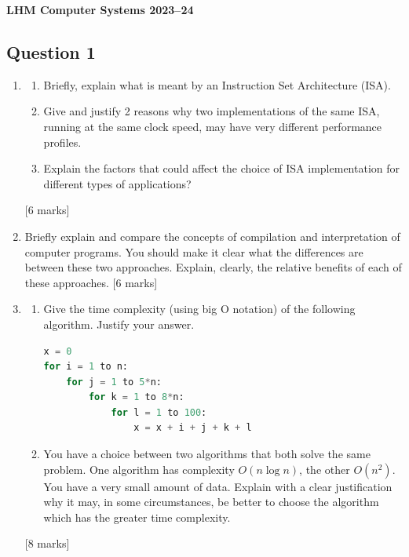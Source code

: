 \textbf{LHM Computer Systems 2023--24}

\subsection{Question 1}

\begin{enumerate}[label=(\alph*)]
    \item 
    \begin{enumerate}[label=(\roman*)]
        \item Briefly, explain what is meant by an Instruction Set Architecture (ISA).
        
        \item Give and justify 2 reasons why two implementations of the same ISA, running at the same clock speed, may have very different performance profiles.
        
        \item Explain the factors that could affect the choice of ISA implementation for different types of applications?
    \end{enumerate}
    \hfill [6 marks]

    \item Briefly explain and compare the concepts of compilation and interpretation of computer programs. You should make it clear what the differences are between these two approaches. Explain, clearly, the relative benefits of each of these approaches.
    \hfill [6 marks]

    \item 
    \begin{enumerate}[label=(\roman*)]
        \item Give the time complexity (using big O notation) of the following algorithm. Justify your answer.
        
        \begin{lstlisting}[language=Python]
x = 0
for i = 1 to n:
    for j = 1 to 5*n:
        for k = 1 to 8*n:
            for l = 1 to 100:
                x = x + i + j + k + l
        \end{lstlisting}
        
        \item You have a choice between two algorithms that both solve the same problem. One algorithm has complexity $O(n \log n)$, the other $O(n^2)$. You have a very small amount of data. Explain with a clear justification why it may, in some circumstances, be better to choose the algorithm which has the greater time complexity.
    \end{enumerate}
    \hfill [8 marks]
\end{enumerate}

